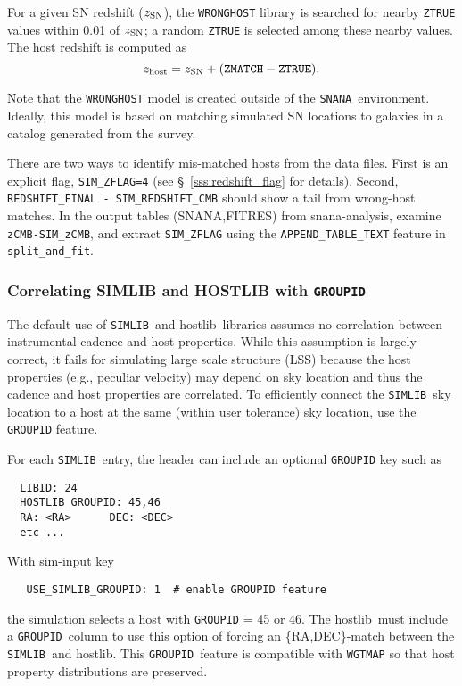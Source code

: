 \documentclass[12pt]{article}
\newcommand{\snana}{{\tt SNANA}}
\newcommand{\simlib}{{\tt SIMLIB}}
\newcommand{\hostlib}{{\sc hostlib}}
\begin{document}
{\newcommand{\zSN}{z_{\rm SN}}
\newcommand{\zHOST}{z_{\rm host}}
For a given SN redshift ($\zSN$), the {\tt WRONGHOST} library is 
searched for nearby {\tt ZTRUE} values within 0.01 of $\zSN$;
a random {\tt ZTRUE} is selected among these nearby values.
The host redshift is computed as
  $$ \zHOST = \zSN + ({\rm\tt ZMATCH - ZTRUE}). $$


Note that the {\tt WRONGHOST} model is created outside
of the \snana\ environment. 
Ideally, this model is based on matching simulated SN 
locations to galaxies in a catalog generated from the survey.


\medskip
There are two ways to identify mis-matched hosts from the data files.
First is an explicit flag, {\tt SIM\_ZFLAG=4} 
(see \S~\ref{sss:redshift_flag} for details).
Second, {\tt REDSHIFT\_FINAL - SIM\_REDSHIFT\_CMB} should 
show a tail from wrong-host matches.
In the output tables (SNANA,FITRES) from snana-analysis,
examine {\tt zCMB-SIM\_zCMB}, and extract {\tt SIM\_ZFLAG}
using the {\tt APPEND\_TABLE\_TEXT} feature in {\tt split\_and\_fit}.


   \clearpage
   \newcommand{\groupid}{{\tt GROUPID}}
   \subsubsection{Correlating SIMLIB and HOSTLIB with {\groupid} }
   \label{sss:groupid}


The default use of \simlib\ and \hostlib\ libraries assumes no correlation
between instrumental cadence and host properties. While this assumption
is largely correct, it fails for simulating large scale structure (LSS)
because the host properties (e.g., peculiar velocity) may depend on 
sky location and thus the cadence and host properties are correlated.
To efficiently connect the \simlib\ sky location to a host at the 
same (within user tolerance) sky location, 
use the {\groupid} feature.

For each \simlib\ entry, the header can include an optional 
{\groupid} key such as
\begin{verbatim}
  LIBID: 24
  HOSTLIB_GROUPID: 45,46
  RA: <RA>      DEC: <DEC>
  etc ...
\end{verbatim}
%
With sim-input key 
\begin{verbatim}
   USE_SIMLIB_GROUPID: 1  # enable GROUPID feature 
\end{verbatim}
%
the simulation selects a host with {\groupid} = 45 or 46.
The \hostlib\ must include a \groupid\ column to use
this option of forcing an \{RA,DEC\}-match between the 
\simlib\ and \hostlib.
This \groupid\  feature is compatible with {\tt WGTMAP} so
that host property distributions are preserved.

}
\end{document}
